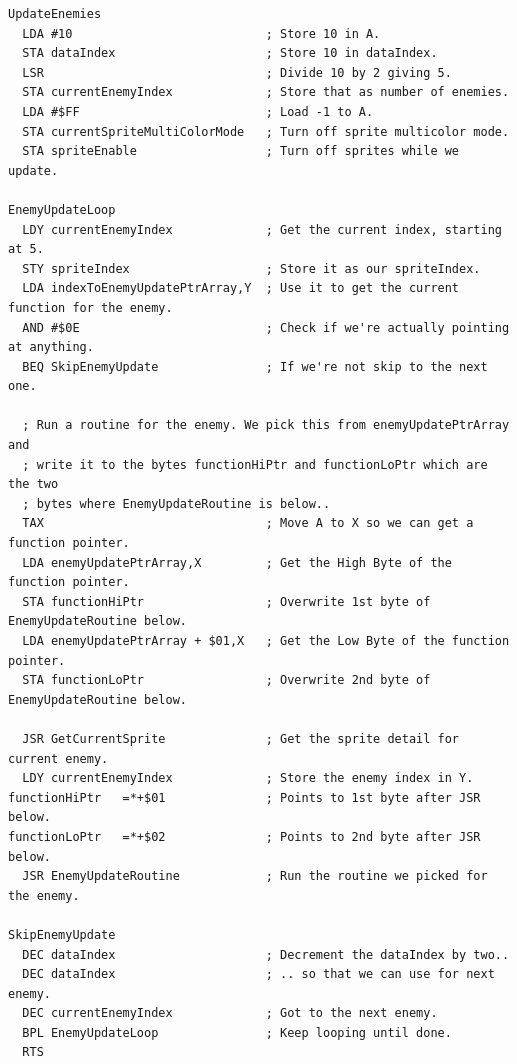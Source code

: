 \begin{lstlisting}[basicstyle=\scriptsize\ttfamily]
UpdateEnemies
  LDA #10                           ; Store 10 in A.
  STA dataIndex                     ; Store 10 in dataIndex.
  LSR                               ; Divide 10 by 2 giving 5.
  STA currentEnemyIndex             ; Store that as number of enemies.
  LDA #$FF                          ; Load -1 to A.
  STA currentSpriteMultiColorMode   ; Turn off sprite multicolor mode.
  STA spriteEnable                  ; Turn off sprites while we update.

EnemyUpdateLoop   
  LDY currentEnemyIndex             ; Get the current index, starting at 5.
  STY spriteIndex                   ; Store it as our spriteIndex.
  LDA indexToEnemyUpdatePtrArray,Y  ; Use it to get the current function for the enemy.
  AND #$0E                          ; Check if we're actually pointing at anything.
  BEQ SkipEnemyUpdate               ; If we're not skip to the next one.

  ; Run a routine for the enemy. We pick this from enemyUpdatePtrArray and
  ; write it to the bytes functionHiPtr and functionLoPtr which are the two
  ; bytes where EnemyUpdateRoutine is below..
  TAX                               ; Move A to X so we can get a function pointer.
  LDA enemyUpdatePtrArray,X         ; Get the High Byte of the function pointer.
  STA functionHiPtr                 ; Overwrite 1st byte of EnemyUpdateRoutine below.
  LDA enemyUpdatePtrArray + $01,X   ; Get the Low Byte of the function pointer.
  STA functionLoPtr                 ; Overwrite 2nd byte of EnemyUpdateRoutine below.

  JSR GetCurrentSprite              ; Get the sprite detail for current enemy.
  LDY currentEnemyIndex             ; Store the enemy index in Y.
functionHiPtr   =*+$01              ; Points to 1st byte after JSR below.
functionLoPtr   =*+$02              ; Points to 2nd byte after JSR below.
  JSR EnemyUpdateRoutine            ; Run the routine we picked for the enemy.

SkipEnemyUpdate
  DEC dataIndex                     ; Decrement the dataIndex by two..
  DEC dataIndex                     ; .. so that we can use for next enemy.
  DEC currentEnemyIndex             ; Got to the next enemy.
  BPL EnemyUpdateLoop               ; Keep looping until done.
  RTS
\end{lstlisting}

